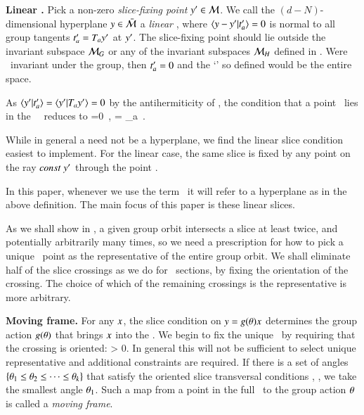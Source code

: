 \begin{definition}
\label{def:slice}
\textbf{Linear \slice.}
Pick a non-zero \emph{slice-fixing point} ${y'} \in {\cal M}$.
We call the $(d\!-\!N)$-dimensional hyperplane $y \in \bar{\cal M}$
a \emph{linear \slice}, where
\(
\braket{\sspRed - \slicep}{\sliceTan{a}}=0
\) %
is normal to all group tangents $ t'_{a}= T_a {y'}$ at ${y'}$. The {slice-fixing point} should lie outside the invariant subspace ${\cal M}_{G}$ or any of the invariant subspaces ${\cal M}_H$ defined in . Were \slicep\ invariant under the group, then $t'_{a}=0$ and the `\slice' so defined would be the entire space.

As $ \braket{\slicep}{\sliceTan{a}}=\braket{\slicep}{\Lg_a \slicep} =0 $ by the antihermiticity of \Lg, the condition that a point \sspRed\ lies in the \slice\ \pSRed\ reduces to
\beq
{}=0
    \,,\qquad
{} = \Lg_a \slicep
\,.
\end{definition}


While in general a {\slice} need not be a hyperplane,
we find the linear slice condition  easiest to implement.
For the linear case, the same slice is fixed by any
point on the ray $const\; {y'}$ through the point \slicep.

In this paper, whenever we use the term \slice\ it will refer to a hyperplane as in the above definition. The main focus of this paper is these linear slices.

As we shall show in , a given group orbit intersects a slice at
least twice, and potentially arbitrarily many times, so we need a prescription for
how to pick a unique \reducedsp\ point as the representative of the entire group orbit.
We shall eliminate half of the slice crossings as we do for
\Poincare\ sections, by fixing the orientation of the crossing.
The choice of which of the remaining crossings is the representative
is more arbitrary.

\begin{definition}
\label{def:movingFrame}
\textbf{Moving frame.}
For any $x$, the slice condition  on $y =
g({\bf \theta})x$ determines the group
action $g({\bf \theta})$ that brings $ x$ into the \slice.
We begin to fix the unique \reducedsp\ by requiring that the crossing is
oriented:
\beq
\braket{\groupTan_{}(\ssp)}{\sliceTan{}} > 0.
In general this will not be sufficient to select unique representative and additional constraints are required.
If there is a set of angles
$\{{\bf \theta}_1\leq{\bf \theta}_2\leq\cdots\leq{\bf \theta}_k \}$ that
satisfy the oriented slice transversal conditions
, , we take the
smallest angle ${\bf \theta}_1$.
Such a map from a point in the full \statesp\ to the group action
${\bf \theta}$ is called a
\emph{moving frame}.
\end{definition}

